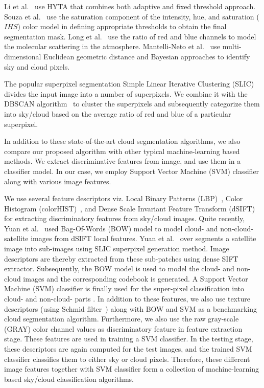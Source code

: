 Li et al.\ \cite{Li2011} use HYTA that combines both adaptive and fixed threshold approach. Souza et al.\ \cite{Souza} use the saturation component of the intensity, hue, and saturation ($IHS$) color model in defining appropriate thresholds to obtain the final segmentation mask. Long et al.\ \cite{Long} use the ratio of red and blue channels to model the molecular scattering in the atmosphere. Mantelli-Neto et al.\ \cite{Sylvio} use multi-dimensional Euclidean geometric distance and Bayesian approaches to identify sky and cloud pixels. 



The popular superpixel segmentation Simple Linear Iterative Clustering (SLIC) divides the input image into a number of superpixels. We combine it with the DBSCAN algorithm~\cite{DBSCAN} to cluster the superpixels and subsequently categorize them into sky/cloud based on the average ratio of red and blue of a particular superpixel. 

In addition to these state-of-the-art cloud segmentation algorithms, we also compare our proposed algorithm with other typical machine-learning based methods. We extract discriminative features from image, and use them in a classifier model. In our case, we employ Support Vector Machine (SVM) classifier along with various image features. 

We use several feature descriptors viz. Local Binary Patterns (LBP)~\cite{LBP_PAMI}, Color Histogram (colorHIST)~\cite{colorhist-CVPR}, and Dense Scale Invariant Feature Transform (dSIFT)~\cite{SIFT} for extracting discriminatory features from sky/cloud images. Quite recently, Yuan et al.\ \cite{BOW-cloud} used Bag-Of-Words (BOW) model to model cloud- and non-cloud- satellite images from dSIFT local features. Yuan et al.\ \cite{BOW-cloud} over segments a satellite image into sub-images using SLIC superpixel generation method. Image descriptors are thereby extracted from these sub-patches using dense SIFT extractor. Subsequently, the BOW model is used to model the cloud- and non-cloud images and the corresponding codebook is generated. A Support Vector Machine (SVM) classifier is finally used for the super-pixel classification into cloud- and non-cloud- parts \cite{BOW-cloud}.
In addition to these features, we also use texture descriptors (using Schmid filter~\cite{Schmid_CVPR}) along with BOW and SVM as a benchmarking cloud segmentation algorithm.
Furthermore, we also use the raw gray-scale (GRAY) color channel values as discriminatory feature in feature extraction stage. These features are used in training a SVM classifier. In the testing stage, these descriptors are again computed for the test images, and the trained SVM classifier classifies them to either sky or cloud pixels. Therefore, these different image features together with SVM classifier form a collection of machine-learning based sky/cloud classification algorithms.



